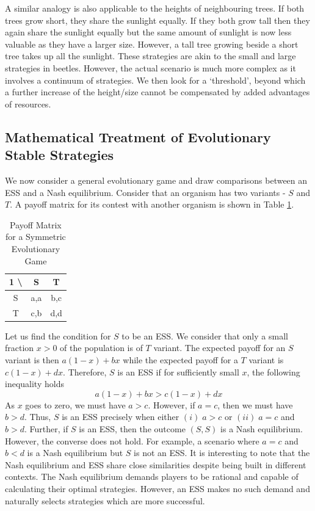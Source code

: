 \documentclass{article}
\theoremstyle{definition}
\begin{document}
A similar analogy is also applicable to the heights of neighbouring trees.  If both trees grow short, they share the sunlight equally. If they both grow tall then they again share the sunlight equally but the same amount of sunlight is now less valuable as they have a larger size. However, a tall tree growing beside a short tree takes up all the sunlight. These strategies are akin to the small and large strategies in beetles. However, the actual scenario is much more complex as it involves a continuum of strategies. We then look for a `threshold', beyond which a further increase of the height/size cannot be compensated by added advantages of resources. \medskip

\subsection{Mathematical Treatment of Evolutionary Stable Strategies}

We now consider a general evolutionary game and draw comparisons between an ESS and a Nash equilibrium. Consider that an organism has two variants - $S$ and $T$. A payoff matrix for its contest with another organism is shown in Table \ref{table:ess}.

\begin{table}[H]
    \begin{adjustbox}{center}
    \begin{tabular}{|c|c|c|}
        \hline
         1 \textbackslash \; 2 & S & T \\
        \hline
        S & a,a & b,c \\
        \hline 
        T & c,b & d,d  \\
        \hline
    \end{tabular}
    \end{adjustbox}
    \caption{Payoff Matrix for a Symmetric Evolutionary Game}
    \label{table:ess}
\end{table}

Let us find the condition for $S$ to be an ESS. We consider that only a small fraction $x >0$ of the population is of $T$ variant. The expected payoff for an $S$ variant is then $a(1-x) + bx$ while the expected payoff for a $T$ variant is $c(1-x) + dx$. Therefore, $S$ is an ESS if for sufficiently small $x$, the following inequality holds
\[
    a(1-x) + bx > c(1-x) + dx
\]
As $x$ goes to zero, we must have $a > c$. However, if $a=c$, then we must have $b>d$. Thus, $S$ is an ESS precisely when either $(i)\; a > c$ or $(ii)\; a=c$ and $b>d$. Further, if $S$ is an ESS, then the outcome $(S,S)$ is a Nash equilibrium. However, the converse does not hold. For example, a scenario where $a=c$ and $b<d$ is a Nash equilibrium but $S$ is not an ESS. It is interesting to note that the Nash equilibrium and ESS share close similarities despite being built in different contexts. The Nash equilibrium demands players to be rational and capable of calculating their optimal strategies. However, an ESS makes no such demand and naturally selects strategies which are more successful.
\end{document}

